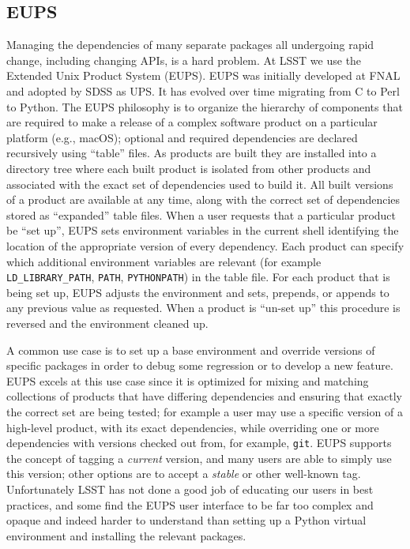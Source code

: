 \subsection{EUPS}\label{sec:eups}

Managing the dependencies of many separate packages all undergoing rapid change, including changing APIs, is a hard problem.
At LSST we use the Extended Unix Product System (EUPS)\cite{EUPS}.
EUPS was initially developed at FNAL and adopted by SDSS as UPS. It has evolved over time migrating from C to Perl to Python.
The EUPS philosophy is to organize the hierarchy of components that are required to make a release of a complex software product on a particular platform (e.g., macOS); optional and required dependencies are declared recursively using ``table'' files.
As products are built they are installed into a directory tree where each built product is isolated from other products and associated with the exact set of dependencies used to build it.
All built versions of a product are available at any time, along with the correct set of dependencies stored as ``expanded'' table files.
When a user requests that a particular product be ``set up'', EUPS sets environment variables in the current shell identifying the location of the appropriate version of every dependency.
Each product can specify which additional environment variables are relevant (for example \texttt{LD\_LIBRARY\_PATH}, \texttt{PATH}, \texttt{PYTHONPATH}) in the table file.
For each product that is being set up, EUPS adjusts the environment and sets, prepends, or appends to any previous value as requested.
When a product is ``un-set up'' this procedure is reversed and the environment cleaned up.

A common use case is to set up a base environment and override versions of specific packages in order to debug some regression or to develop a new feature.
EUPS excels at this use case since it is optimized for mixing and matching collections of products that have differing dependencies and ensuring that exactly the correct set are being tested; for example a user may use a specific version of a high-level product, with its exact dependencies, while overriding one or more dependencies with versions checked out from, for example, \texttt{git}.
EUPS supports the concept of tagging a \emph{current} version, and many users are able to simply use this version; other options are to accept a \emph{stable} or other well-known tag.
Unfortunately LSST has not done a good job of educating our users in best practices, and some find the EUPS user interface to be far too complex and opaque and indeed harder to understand than setting up a Python virtual environment and installing the relevant packages.

